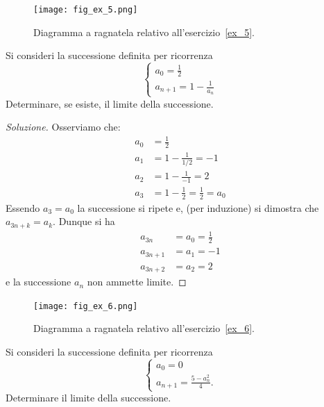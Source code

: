 \begin{figure}
 \begin{center}
    \texttt{[image: fig\_ex\_5.png]}
  \end{center}
  \caption{Diagramma a ragnatela relativo
    all'esercizio~\ref{ex_5}.}
  \label{fig_ex_5}
\end{figure}

\begin{exercise}\label{ex_5}
  Si consideri la successione definita per ricorrenza
  \[
  \begin{cases}
    a_0 = \frac 1 2\\
    a_{n+1} = 1 - \frac{1}{a_n}
  \end{cases}
  \]
  Determinare, se esiste, il limite della successione.
\end{exercise}

\begin{proof}[Soluzione]
  Osserviamo che:
  \begin{align*}
    a_0 &= \frac 1 2 \\
    a_1 &= 1 - \frac{1}{1/2} = -1\\
    a_2 &= 1 - \frac{1}{-1} = 2\\
    a_3 &= 1 - \frac{1}{2} = \frac 1 2 = a_0
  \end{align*}
  Essendo $a_3 = a_0$ la successione si ripete e, (per induzione) si
  dimostra che $a_{3n+k} = a_k$. Dunque si ha
  \begin{align*}
    a_{3n} &= a_0 = \frac 1 2\\
    a_{3n+1} &= a_1 = -1\\
    a_{3n+2} &= a_2 = 2
  \end{align*}
  e la successione $a_n$ non ammette limite.
\end{proof}

\begin{figure}
  \begin{center}
    \texttt{[image: fig\_ex\_6.png]}
  \end{center}
  \caption{Diagramma a ragnatela relativo
    all'esercizio~\ref{ex_6}.}
  \label{fig_ex_6}
\end{figure}

\begin{exercise}\label{ex_6}
  Si consideri la successione definita per ricorrenza
  \[
  \begin{cases}
    a_0 = 0\\
    a_{n+1} = \frac{5-a_n^2}{4}.
  \end{cases}
  \]
  Determinare il limite della successione.
\end{exercise}

